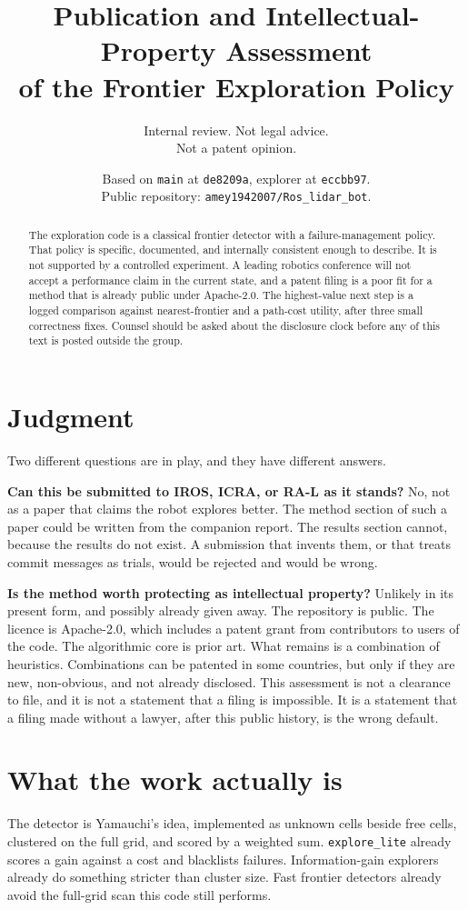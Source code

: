 \documentclass[11pt]{article}
\title{Publication and Intellectual-Property Assessment\\of the Frontier Exploration Policy}
\author{Internal review. Not legal advice.\\Not a patent opinion.}
\date{Based on \texttt{main} at \texttt{de8209a}, explorer at \texttt{eccbb97}.\\Public repository: \texttt{amey1942007/Ros\_lidar\_bot}.}
\begin{document}
\maketitle

\begin{abstract}
\noindent
The exploration code is a classical frontier detector with a failure-management policy. That policy is specific, documented, and internally consistent enough to describe. It is not supported by a controlled experiment. A leading robotics conference will not accept a performance claim in the current state, and a patent filing is a poor fit for a method that is already public under Apache-2.0. The highest-value next step is a logged comparison against nearest-frontier and a path-cost utility, after three small correctness fixes. Counsel should be asked about the disclosure clock before any of this text is posted outside the group.
\end{abstract}

\section{Judgment}
Two different questions are in play, and they have different answers.

\textbf{Can this be submitted to IROS, ICRA, or RA-L as it stands?} No, not as a paper that claims the robot explores better. The method section of such a paper could be written from the companion report. The results section cannot, because the results do not exist. A submission that invents them, or that treats commit messages as trials, would be rejected and would be wrong.

\textbf{Is the method worth protecting as intellectual property?} Unlikely in its present form, and possibly already given away. The repository is public. The licence is Apache-2.0, which includes a patent grant from contributors to users of the code. The algorithmic core is prior art. What remains is a combination of heuristics. Combinations can be patented in some countries, but only if they are new, non-obvious, and not already disclosed. This assessment is not a clearance to file, and it is not a statement that a filing is impossible. It is a statement that a filing made without a lawyer, after this public history, is the wrong default.

\section{What the work actually is}
The detector is Yamauchi's idea, implemented as unknown cells beside free cells, clustered on the full grid, and scored by a weighted sum. \texttt{explore\_lite} already scores a gain against a cost and blacklists failures. Information-gain explorers already do something stricter than cluster size. Fast frontier detectors already avoid the full-grid scan this code still performs.
\end{document}
